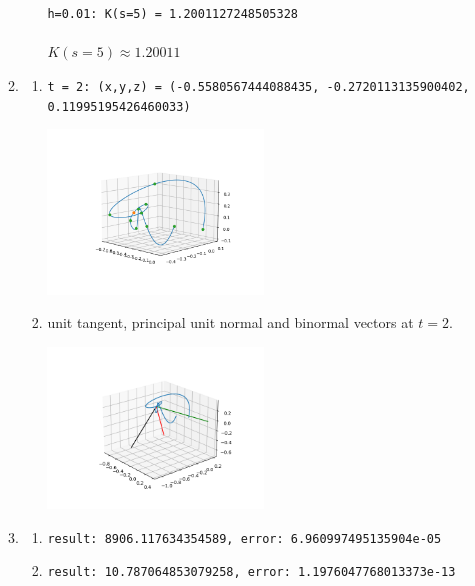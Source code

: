 \documentclass[11pt]{article}
\newcommand{\Newpage}{\end{preview}\begin{preview}}
\begin{document}
\begin{preview}
\begin{enumerate}
\begin{enumerate}
\begin{enumerate}
                          \texttt{h=0.01: K(s=5) = 1.2001127248505328} \\\\
                          $K(s=5) \approx 1.20011$
                  \end{enumerate}
            \item
                  \begin{enumerate}
                    \item \texttt{t = 2: (x,y,z) = (-0.5580567444088435, -0.2720113135900402, 0.11995195426460033)}
                          \begin{center}
                            \includegraphics[width=0.5\textwidth]{inc/q4bi_0.png}
                          \end{center}
                    \item unit tangent, principal unit normal and binormal vectors at $t = 2$.
                          \begin{center}
                            \includegraphics[width=0.5\textwidth]{inc/q4bii.png}
                          \end{center}
                  \end{enumerate}
            \item
                  \begin{enumerate}
                    \item \texttt{result: 8906.117634354589, error: 6.960997495135904e-05}
                    \item \texttt{result: 10.787064853079258, error: 1.1976047768013373e-13}
                  \end{enumerate}
          \end{enumerate}
  \end{enumerate}

  \Newpage


\end{preview}
\end{document}
